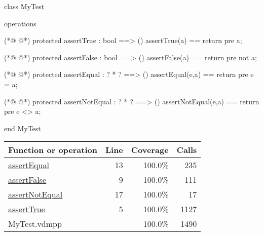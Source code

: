 \begin{vdmpp}[breaklines=true]
class MyTest

operations

(*@
\label{assertTrue:5}
@*)
 protected assertTrue : bool ==> ()
  assertTrue(a) == return
  pre a;
 
(*@
\label{assertFalse:9}
@*)
 protected assertFalse : bool ==> ()
  assertFalse(a) == return
  pre not a;
 
(*@
\label{assertEqual:13}
@*)
 protected assertEqual : ? * ? ==> ()
 assertEqual(e,a) == return
 pre e = a;
 
(*@
\label{assertNotEqual:17}
@*)
 protected assertNotEqual : ? * ? ==> ()
 assertNotEqual(e,a) == return
 pre e <> a;

end MyTest
\end{vdmpp}
\bigskip
\begin{longtable}{|l|r|r|r|}
\hline
Function or operation & Line & Coverage & Calls \\
\hline
\hline
\hyperref[assertEqual:13]{assertEqual} & 13&100.0\% & 235 \\
\hline
\hyperref[assertFalse:9]{assertFalse} & 9&100.0\% & 111 \\
\hline
\hyperref[assertNotEqual:17]{assertNotEqual} & 17&100.0\% & 17 \\
\hline
\hyperref[assertTrue:5]{assertTrue} & 5&100.0\% & 1127 \\
\hline
\hline
MyTest.vdmpp & & 100.0\% & 1490 \\
\hline
\end{longtable}

